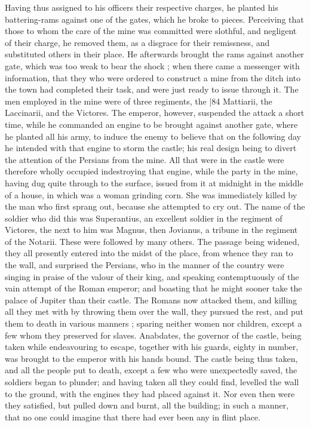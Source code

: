 Having thus assigned to his officers their respective charges, he planted his battering-rams against one of the gates, which he broke to pieces. Perceiving that those to whom the care of the mine was committed were slothful, and negligent of their charge, he removed them, as a disgrace for their remissness, and substituted others in their place. He afterwards brought the rams against another gate, which was too weak to bear the shock ; when there came a messenger with information, that they who were ordered to construct a mine from the ditch into
the town had completed their task, and were just ready to issue through it. The men employed in the mine were of three regiments, the
|84 Mattiarii, the Laccinarii, and the Victores. The emperor, however, suspended the attack a short time, while he commanded an engine to be brought against another gate, where he planted all his army, to induce the enemy to believe that on the following day he intended with that engine to storm the castle; his real design being to divert the attention of the Persians from the mine. All that were in the castle were therefore wholly occupied in\emph{}destroying that engine, while the party in the mine, having dug quite through to the surface, issued from it at midnight in the middle of a house, in which was a woman grinding corn. She was immediately killed by the man who first sprang out, because she attempted to cry out. The name of the soldier who did this was Superantius, an excellent soldier in the regiment of Victores, the next to him was Magnus, then Jovianus, a tribune in the regiment of the Notarii. These were followed by many others. The passage being widened, they all presently entered into the midst of the place, from whence they ran to the wall, and surprised the Persians, who in the manner of the country were singing in praise of the valour of their king, and speaking contemptuously of the vain attempt of the Roman emperor; and boasting that he might sooner take the palace of Jupiter than their castle. The Romans now attacked them, and killing all they met with by throwing them over the wall, they pursued the rest, and put them to death in various manners ; sparing neither women nor children, except a few whom they preserved for slaves. Anabdates, the governor of the castle, being taken while endeavouring to escape, together with his guards, eighty in number, was brought to the emperor with his hands bound. The castle being thus taken, and all the people put to death, except a few who were unexpectedly saved, the soldiers began to plunder; and having taken all they could find, levelled the wall to the ground, with the engines they had placed against it. Nor even then were they satisfied, but pulled down and burnt, all the building; in such a manner, that no one could imagine that there had ever been any in flint place.


